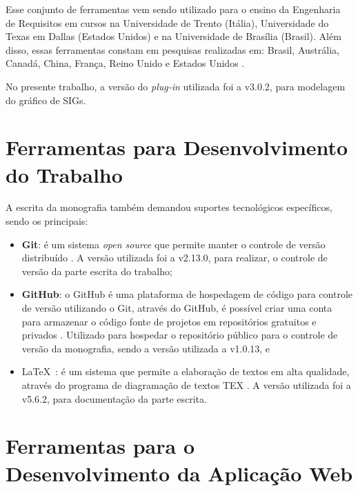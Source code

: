 \begin{itemize}
	Esse conjunto de ferramentas vem sendo utilizado para o ensino da Engenharia de Requisitos em cursos na Universidade de Trento (Itália), Universidade do Texas em Dallas (Estados Unidos) e na Universidade de Brasília (Brasil). Além disso, essas ferramentas constam em pesquisas realizadas em: Brasil, Austrália, Canadá, China, França, Reino Unido e Estados Unidos \cite{supakkul2012re}.
	
	No presente trabalho, a versão do \textit{plug-in} utilizada foi a v3.0.2, para modelagem do gráfico de SIGs. 
\end{itemize}

\section{Ferramentas para Desenvolvimento do Trabalho}
\label{sec:ferramentasDesenvolvimento}

A escrita da monografia também demandou suportes tecnológicos específicos, sendo os principais:

\begin{itemize}
	
	\item \textbf{Git}: é um sistema \textit{open source} que permite manter o controle de versão distribuído \cite{git}. A versão utilizada foi a v2.13.0, para realizar, o controle de versão da parte escrita do trabalho;
	
	\item \textbf{GitHub}: o GitHub é uma plataforma de hospedagem de código para controle de versão utilizando o Git, através do GitHub, é possível criar uma conta para armazenar o código fonte de projetos em repositórios gratuitos e privados \cite{github}. Utilizado para hospedar o repositório público para o controle de versão da monografia, sendo a versão utilizada a v1.0.13, e
	
	\item \LaTeX\ : é um sistema que permite a elaboração de textos em alta qualidade, através do programa de diagramação de textos TEX \cite{latex}. A versão utilizada foi a v5.6.2, para documentação da parte escrita.
	
\end{itemize}

\section{Ferramentas para o Desenvolvimento da Aplicação Web}
\label{sec:ferramentasParaDesenvolvimentoWebApp}

